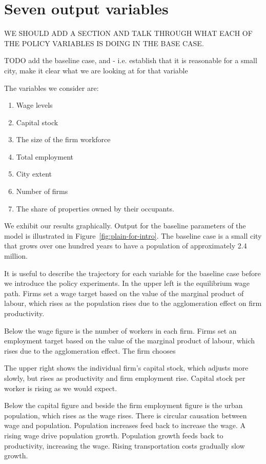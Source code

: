 \section{Seven output variables}

{\color{red} WE SHOULD ADD A SECTION AND TALK THROUGH WHAT EACH OF THE POLICY VARIABLES IS DOING IN THE BASE CASE.}

{\color{red} TODO add the baseline case, and  - i.e. establish that it is reasonable for a small city, make it clear what we are looking at for that variable}

The variables we consider are:
\begin{enumerate}
    \item Wage levels
    \item Capital stock
    \item The size of the firm workforce
    \item Total employment
    \item City extent
    \item Number of firms
    \item The share of properties owned by their occupants.
\end{enumerate} 
We exhibit our results graphically.  Output for the baseline parameters of the model is illustrated in Figure~\ref{fig:plain-for-intro}. The baseline case is a small city that grows over one hundred years to have a population of approximately 2.4 million. 

It is useful to describe the trajectory for each variable for the baseline case before we introduce the policy experiments.  In the upper left is the equilibrium wage path.  Firms set a wage target based on the value of the marginal product of labour, which rises as the population rises due to the agglomeration effect on firm productivity.

Below the wage figure is the number of workers in each firm. Firms set an employment target based on the value of the marginal product of labour, which rises due to the agglomeration effect. The firm chooses 

The upper right shows the individual firm's capital stock, which adjusts more slowly, but rises as productivity and firm employment rise.  Capital stock per worker is rising as we would expect.

Below the capital figure and beside the firm employment figure is the urban population, which rises as the wage rises. There is circular causation between wage and population. Population increases feed back to increase the wage. A rising wage drive population growth. Population growth feeds back to productivity, increasing the wage. Rising transportation costs gradually slow growth.


